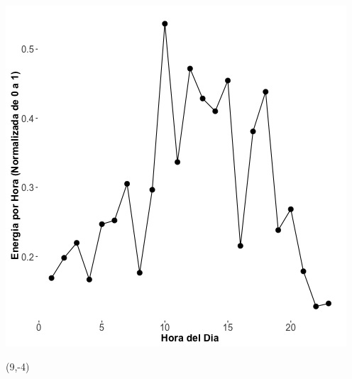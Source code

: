 \documentclass{article}\usepackage[]{graphicx}\usepackage[]{color}
\newenvironment{knitrout}{}{} %
\begin{document}
%

 \vspace{2cm}

\begin{knitrout}
\color{fgcolor}
\includegraphics[scale=0.75]{figure/A1_fplot_norm_median} 
\end{knitrout}


 \begin{textblock}{1}(9,-4)
\begin{minipage}{20em}
\begingroup

\endgroup
\end{minipage}
\end{textblock}

 \vspace{2cm}


%
\end{document}
